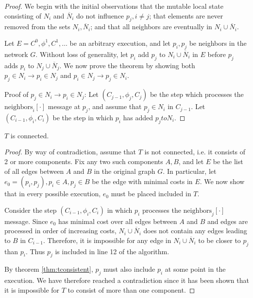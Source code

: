 \begin{proof}
We begin with the initial observations that the mutable local state consisting of $N_i$ and
$\overline{N}_i$ do not influence $p_j, i \neq j$; that elements are never removed from the sets
$N_i, \overline{N}_i$; and that all neighbors are eventually in
$N_i \cup \overline{N}_i$.

Let $E = C^0, \phi^1, C^1, \ldots$ be an arbitrary execution, and let $p_i, p_j$ be neighbors
in the network $G$. Without loss of generality, let $p_i$ add $p_j$ to $N_i \cup \overline{N}_i$
in $E$ before $p_j$ adds $p_i$ to $N_j \cup \overline{N}_j$. We now prove the theorem by
showing both $p_j \in N_i \rightarrow p_i \in N_j$ and $p_i \in N_j \rightarrow p_j \in N_i$.

Proof of $p_j \in N_i \rightarrow p_i \in N_j$: Let $(C_{j-1}, \phi_j, C_j)$ be the step which processes
the $\text{neighbors}_i[\cdot]$ message at $p_j$, and assume that $p_j \in N_i$ in $C_{j-1}$.
Let $(C_{i-1}, \phi_i, C_i)$ be the step in which $p_i$ has added $p_j to N_i$.


\end{proof}

\begin{theorem}
$T$ is connected.
\end{theorem}

\begin{proof}
By way of contradiction, assume that $T$ is not connected, i.e. it consists of 2
or more components. Fix any two such components $A, B$, and let $E$ be the list
of all edges between $A$ and $B$ in the original graph $G$. In particular, let
$e_0 = (p_i, p_j), p_i \in A, p_j \in B$ be the edge with minimal costs in $E$.
We now show that in every 
possible execution, $e_0$ must be placed included in $T$.

Consider the step $(C_{i-1}, \phi_i, C_i)$ in which $p_i$ processes the 
$\text{neighbors}_j[\cdot]$ message. Since $e_0$ has minimal cost over all edges
between $A$ and $B$ and edges are processed in order of increasing costs,
$N_i \cup \overline{N}_i$ does not contain any edges
leading to $B$ in $C_{i-1}$. Therefore, it is impossible for any edge in 
$N_i \cup \overline{N}_i$ to be closer to $p_j$ than $p_i$. Thus $p_j$
is included in line 12 of the algorithm.

By theorem \ref{thm:tconsistent}, $p_j$ must also include $p_i$ at some point
in the execution. We have therefore reached a contradiction since it has been
shown that it is impossible for $T$ to consist of more than one component.
\end{proof}
